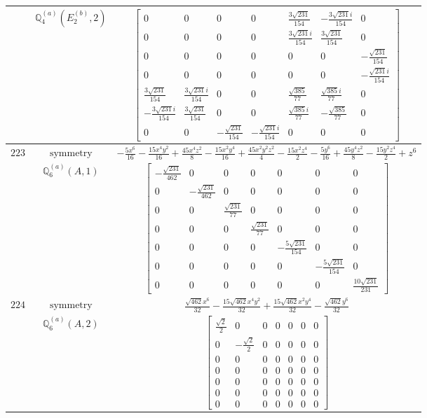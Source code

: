 \documentclass[fleqn,8pt,landscape]{jsarticle}
\begin{document}
\begin{longtable}{ccc}
$  $ & $ \mathbb{Q}_{4}^{(a)}(E_{2}^{(b)},2) $ & $ \begin{bmatrix} 0 & 0 & 0 & 0 & \frac{3 \sqrt{231}}{154} & - \frac{3 \sqrt{231} i}{154} & 0 \\ 0 & 0 & 0 & 0 & \frac{3 \sqrt{231} i}{154} & \frac{3 \sqrt{231}}{154} & 0 \\ 0 & 0 & 0 & 0 & 0 & 0 & - \frac{\sqrt{231}}{154} \\ 0 & 0 & 0 & 0 & 0 & 0 & - \frac{\sqrt{231} i}{154} \\ \frac{3 \sqrt{231}}{154} & \frac{3 \sqrt{231} i}{154} & 0 & 0 & \frac{\sqrt{385}}{77} & \frac{\sqrt{385} i}{77} & 0 \\ - \frac{3 \sqrt{231} i}{154} & \frac{3 \sqrt{231}}{154} & 0 & 0 & \frac{\sqrt{385} i}{77} & - \frac{\sqrt{385}}{77} & 0 \\ 0 & 0 & - \frac{\sqrt{231}}{154} & - \frac{\sqrt{231} i}{154} & 0 & 0 & 0 \end{bmatrix} $ \\ \hline
$ 223 $ & $ \text{symmetry} $ & $ - \frac{5 x^{6}}{16} - \frac{15 x^{4} y^{2}}{16} + \frac{45 x^{4} z^{2}}{8} - \frac{15 x^{2} y^{4}}{16} + \frac{45 x^{2} y^{2} z^{2}}{4} - \frac{15 x^{2} z^{4}}{2} - \frac{5 y^{6}}{16} + \frac{45 y^{4} z^{2}}{8} - \frac{15 y^{2} z^{4}}{2} + z^{6} $ \\
$  $ & $ \mathbb{Q}_{6}^{(a)}(A,1) $ & $ \begin{bmatrix} - \frac{\sqrt{231}}{462} & 0 & 0 & 0 & 0 & 0 & 0 \\ 0 & - \frac{\sqrt{231}}{462} & 0 & 0 & 0 & 0 & 0 \\ 0 & 0 & \frac{\sqrt{231}}{77} & 0 & 0 & 0 & 0 \\ 0 & 0 & 0 & \frac{\sqrt{231}}{77} & 0 & 0 & 0 \\ 0 & 0 & 0 & 0 & - \frac{5 \sqrt{231}}{154} & 0 & 0 \\ 0 & 0 & 0 & 0 & 0 & - \frac{5 \sqrt{231}}{154} & 0 \\ 0 & 0 & 0 & 0 & 0 & 0 & \frac{10 \sqrt{231}}{231} \end{bmatrix} $ \\ \hline
$ 224 $ & $ \text{symmetry} $ & $ \frac{\sqrt{462} x^{6}}{32} - \frac{15 \sqrt{462} x^{4} y^{2}}{32} + \frac{15 \sqrt{462} x^{2} y^{4}}{32} - \frac{\sqrt{462} y^{6}}{32} $ \\
$  $ & $ \mathbb{Q}_{6}^{(a)}(A,2) $ & $ \begin{bmatrix} \frac{\sqrt{2}}{2} & 0 & 0 & 0 & 0 & 0 & 0 \\ 0 & - \frac{\sqrt{2}}{2} & 0 & 0 & 0 & 0 & 0 \\ 0 & 0 & 0 & 0 & 0 & 0 & 0 \\ 0 & 0 & 0 & 0 & 0 & 0 & 0 \\ 0 & 0 & 0 & 0 & 0 & 0 & 0 \\ 0 & 0 & 0 & 0 & 0 & 0 & 0 \\ 0 & 0 & 0 & 0 & 0 & 0 & 0 \end{bmatrix} $ \\ \hline

\end{longtable}
\end{document}
